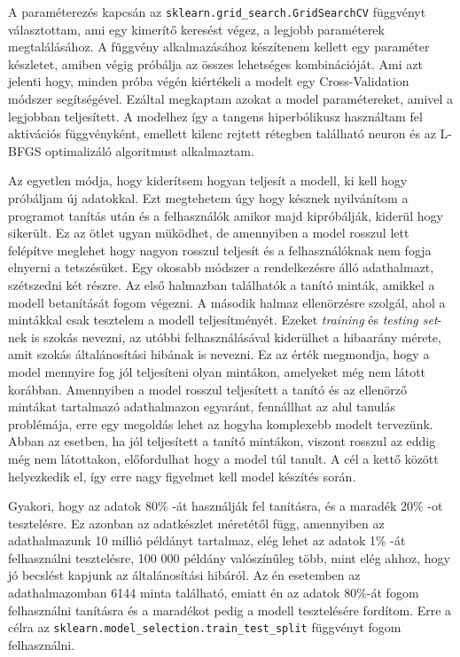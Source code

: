 
A paraméterezés kapcsán az \texttt{sklearn.grid\_search.GridSearchCV} függvényt választottam, ami egy kimerítő keresést végez, a legjobb paraméterek megtalálásához. A függvény alkalmazásához készítenem kellett egy paraméter készletet, amiben végig próbálja az összes lehetséges kombinációját. Ami azt jelenti hogy, minden próba végén kiértékeli a modelt egy Cross-Validation módszer segítségével. Ezáltal megkaptam azokat a model paramétereket, amivel a legjobban teljesített.
A modelhez így a tangens hiperbólikusz használtam fel aktivációs függvényként, emellett kilenc rejtett rétegben található neuron és az L-BFGS optimalizáló algoritmust alkalmaztam.

Az egyetlen módja, hogy kiderítsem hogyan teljesít a modell, ki kell hogy próbáljam új adatokkal. 
Ezt megtehetem úgy hogy késznek nyilvánítom a programot tanítás után és a felhasználók amikor majd kipróbálják, kiderül hogy sikerült. Ez az ötlet ugyan müködhet, de amennyiben a model rosszul lett felépítve meglehet hogy nagyon rosszul teljesít és a felhasználóknak nem fogja elnyerni a tetszésüket. Egy okosabb módszer a rendelkezésre álló adathalmazt, szétszedni két részre. Az első halmazban találhatók a tanító minták, amikkel a modell betanítását fogom végezni. A második halmaz ellenörzésre szolgál, ahol a mintákkal csak tesztelem a modell teljesítményét.
Ezeket \textit{training} és \textit{testing set}-nek is szokás nevezni, az utóbbi felhasználásával kiderülhet a hibaarány mérete, amit szokás általánosítási hibának is nevezni. Ez az érték megmondja, hogy a model mennyire fog jól teljesíteni olyan mintákon, amelyeket még nem látott korábban.
Amennyiben a model rosszul teljesített a tanító és az ellenörző mintákat tartalmazó adathalmazon egyaránt, fennállhat az alul tanulás problémája, erre egy megoldás lehet az hogyha komplexebb modelt tervezünk. Abban az esetben, ha jól teljesített a tanító mintákon, viszont rosszul az eddig még nem látottakon, előfordulhat hogy a model túl tanult. A cél a kettő között helyezkedik el, így erre nagy figyelmet kell model készítés során.

Gyakori, hogy az adatok 80\% -át használják fel tanításra, és a maradék 20\% -ot tesztelésre. Ez azonban az adatkészlet méretétől függ, amennyiben az adathalmazunk 10 millió példányt tartalmaz, elég lehet az adatok 1\% -át felhasználni tesztelésre, 100 000 példány valószínűleg több, mint
elég ahhoz, hogy jó becslést kapjunk az általánosítási hibáról. Az én esetemben az adathalmazomban 6144 minta található, emiatt én az adatok 80\%-át fogom felhasználni tanításra és a maradékot pedig a modell tesztelésére fordítom. Erre a célra az \texttt{sklearn.model\_selection.train\_test\_split} függvényt fogom felhasználni. 

